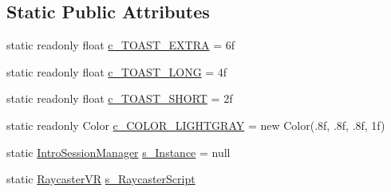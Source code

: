 \subsection*{Static Public Attributes}
\begin{DoxyCompactItemize}
\item 
static readonly float \mbox{\hyperlink{class_intro_session_manager_a34742224aa0d8383b9153c24c4995e4c}{c\+\_\+\+T\+O\+A\+S\+T\+\_\+\+E\+X\+T\+RA}} = 6f
\item 
static readonly float \mbox{\hyperlink{class_intro_session_manager_ace53262c015b3c124166d5fcf5813b40}{c\+\_\+\+T\+O\+A\+S\+T\+\_\+\+L\+O\+NG}} = 4f
\item 
static readonly float \mbox{\hyperlink{class_intro_session_manager_af8478d0e7c13bd12f28b785b95a1851f}{c\+\_\+\+T\+O\+A\+S\+T\+\_\+\+S\+H\+O\+RT}} = 2f
\item 
static readonly Color \mbox{\hyperlink{class_intro_session_manager_aba87a1dd94fe94906cc2b8590d4bc430}{c\+\_\+\+C\+O\+L\+O\+R\+\_\+\+L\+I\+G\+H\+T\+G\+R\+AY}} = new Color(.\+8f, .\+8f, .\+8f, 1f)
\item 
static \mbox{\hyperlink{class_intro_session_manager}{Intro\+Session\+Manager}} \mbox{\hyperlink{class_intro_session_manager_a206bd6bc9edad9b90ee89aa85b00000c}{s\+\_\+\+Instance}} = null
\item 
static \mbox{\hyperlink{class_v_r_standard_assets_1_1_utils_1_1_raycaster_v_r}{Raycaster\+VR}} \mbox{\hyperlink{class_intro_session_manager_ae797af3e2ada3170f3c9f533b88a3806}{s\+\_\+\+Raycaster\+Script}}
\end{DoxyCompactItemize}
